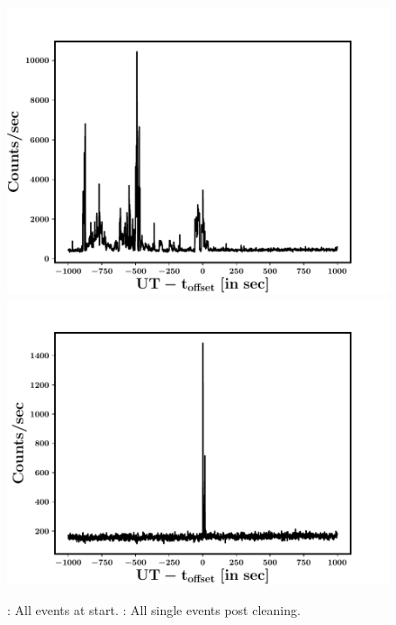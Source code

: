 \begin{figure}
\begin{center}
\includegraphics[scale=0.42]{GRB160802A--Q0--allevts_at_start--1s}
\includegraphics[scale=0.42]{GRB160802A--Q0--sglevts--cleaned_all--1s}
\caption[Lightcurves before and after data processing]{\eL: All events at start. \eR: All single events post cleaning.}
\label{fig:cleaning_example}
\end{center}
\end{figure}


